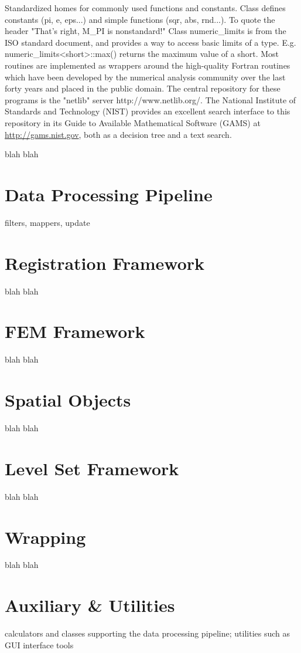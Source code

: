 Standardized homes for commonly used functions and constants. Class  defines constants (pi, e, eps...) and simple functions (sqr, abs, rnd...). To quote the header "That's right, M\_PI is nonstandard!" Class numeric\_limits is from the ISO standard document, and provides a way to access basic limits of a type. E.g. numeric\_limits<short>::max() returns the maximum value of a short. 
Most routines are implemented as wrappers around the high-quality Fortran routines which have been developed by the numerical analysis community over the last forty years and placed in the public domain. The central repository for these programs is the "netlib" server http://www.netlib.org/. The National Institute of Standards and Technology (NIST) provides an excellent search interface to this repository in its Guide to Available Mathematical Software (GAMS) at \url{http://gams.nist.gov}, both as a decision tree and a text search. 

blah blah

\section{Data Processing Pipeline}
\label{sec:DataProcessingPipeline}

filters, mappers, update

\section{Registration Framework}
\label{sec:RegistrationFramework}

blah blah

\section{FEM Framework}
\label{sec:FEMFramework}

blah blah

\section{Spatial Objects}
\label{sec:SpatialObjects}

blah blah

\section{Level Set Framework}
\label{sec:LevelSetFramework}

blah blah

\section{Wrapping}
\label{sec:Wrapping}

blah blah

\section{Auxiliary \& Utilities}
\label{sec:Auxiliary}
\label{sec:Utilities}

calculators and classes supporting the data processing pipeline;
utilities such as GUI interface tools

